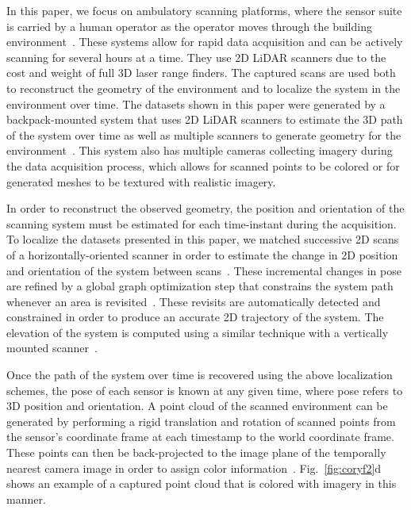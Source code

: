 \documentclass[10pt,twocolumn,twoside]{IEEEtran}
\begin{document}
In this paper, we focus on ambulatory scanning platforms, where the sensor suite is carried by a human operator as the operator moves through the building environment~\cite{Sweep,MITBackpack,VillageHeritage}.  These systems allow for rapid data acquisition and can be actively scanning for several hours at a time.  They use 2D LiDAR scanners due to the cost and weight of full 3D laser range finders.  The captured scans are used both to reconstruct the geometry of the environment and to localize the system in the environment over time.  The datasets shown in this paper were generated by a backpack-mounted system that uses 2D LiDAR scanners to estimate the 3D path of the system over time as well as multiple scanners to generate geometry for the environment~\cite{liu2010indoor,Backpack,Localization,NickJournal}.  This system also has multiple cameras collecting imagery during the data acquisition process, which allows for scanned points to be colored or for generated meshes to be textured with realistic imagery. 


In order to reconstruct the observed geometry, the position and orientation of the scanning system must be estimated for each time-instant during the acquisition.  To localize the datasets presented in this paper, we matched successive 2D scans of a horizontally-oriented scanner in order to estimate the change in 2D position and orientation of the system between scans~\cite{NickJournal}.  These incremental changes in pose are refined by a global graph optimization step that constrains the system path whenever an area is revisited~\cite{toro07}.  These revisits are automatically detected and constrained in order to produce an accurate 2D trajectory of the system.  The elevation of the system is computed using a similar technique with a vertically mounted scanner~\cite{Backpack}.


Once the path of the system over time is recovered using the above localization schemes, the pose of each sensor is known at any given time, where pose refers to 3D position and orientation.  A point cloud of the scanned environment can be generated by performing a rigid translation and rotation of scanned points from the sensor's coordinate frame at each timestamp to the world coordinate frame.  These points can then be back-projected to the image plane of the temporally nearest camera image in order to assign color information~\cite{Backpack}.  Fig.~\ref{fig:coryf2}d shows an example of a captured point cloud that is colored with imagery in this manner.
\end{document}
